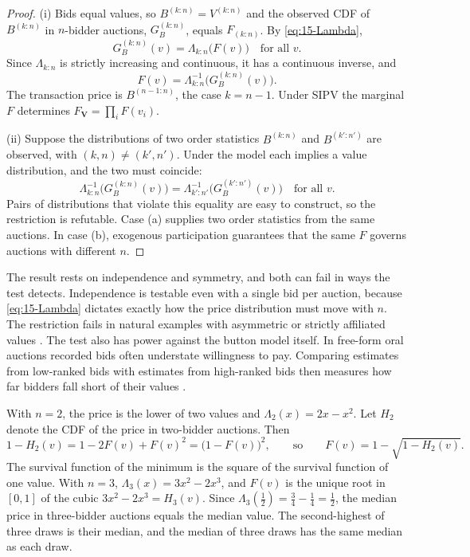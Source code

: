 \begin{proof}
(i) Bids equal values, so $B^{(k:n)}=V^{(k:n)}$ and the observed CDF of $B^{(k:n)}$ in $n$-bidder auctions,
$G_B^{(k:n)}$, equals $F_{(k:n)}$. By \eqref{eq:15-Lambda},
\[
G_B^{(k:n)}(v)=\Lambda_{k:n}\big(F(v)\big)\quad\text{for all }v .
\]
Since $\Lambda_{k:n}$ is strictly increasing and continuous, it has a continuous inverse, and
\[
F(v)=\Lambda_{k:n}^{-1}\big(G_B^{(k:n)}(v)\big).
\]
The transaction price is $B^{(n-1:n)}$, the case $k=n-1$. Under SIPV the marginal $F$ determines
$F_{\bm V}=\prod_iF(v_i)$.

(ii) Suppose the distributions of two order statistics $B^{(k:n)}$ and $B^{(k':n')}$ are observed, with
$(k,n)\neq(k',n')$. Under the model each implies a value distribution, and the two must coincide:
\[
\Lambda_{k:n}^{-1}\big(G_B^{(k:n)}(v)\big)=\Lambda_{k':n'}^{-1}\big(G_B^{(k':n')}(v)\big)\quad\text{for all }v .
\]
Pairs of distributions that violate this equality are easy to construct, so the restriction is refutable. Case (a)
supplies two order statistics from the same auctions. In case (b), exogenous participation guarantees that the same
$F$ governs auctions with different $n$.
\end{proof}

The result rests on independence and symmetry, and both can fail in ways the test detects. Independence is
testable even with a single bid per auction, because \eqref{eq:15-Lambda} dictates exactly how the price
distribution must move with $n$. The restriction fails in natural examples with asymmetric or strictly affiliated
values \citep[footnote~20]{AtheyHaile2002}. The test also has power against the button model itself. In free-form
oral auctions recorded bids often understate willingness to pay. Comparing estimates from low-ranked bids with
estimates from high-ranked bids then measures how far bidders fall short of their values
\citep[footnote~19]{AtheyHaile2002}.

\begin{example}\label{ex:15-asc-n2}
With $n=2$, the price is the lower of two values and $\Lambda_2(x)=2x-x^2$. Let $H_2$ denote the CDF of the price in
two-bidder auctions. Then
\[
1-H_2(v)=1-2F(v)+F(v)^2=\big(1-F(v)\big)^2,
\qquad\text{so}\qquad
F(v)=1-\sqrt{1-H_2(v)} .
\]
The survival function of the minimum is the square of the survival function of one value. With $n=3$,
$\Lambda_3(x)=3x^2-2x^3$, and $F(v)$ is the unique root in $[0,1]$ of the cubic $3x^2-2x^3=H_3(v)$. Since
$\Lambda_3(\frac12)=\frac34-\frac14=\frac12$, the median price in three-bidder auctions equals the median value. The
second-highest of three draws is their median, and the median of three draws has the same median as each draw.
\end{example}


